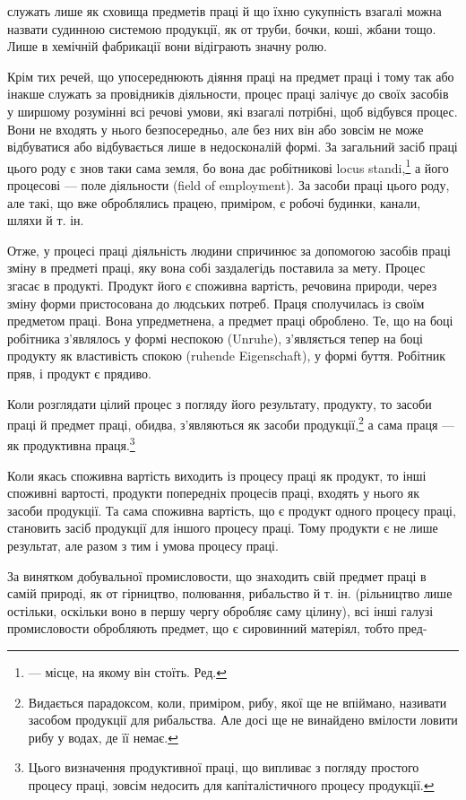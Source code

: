 служать лише як сховища предметів праці й що їхню сукупність
взагалі можна назвати судинною системою продукції, як от
труби, бочки, коші, жбани тощо. Лише в хемічній фабрикації
вони відіграють значну ролю.

Крім тих речей, що упосереднюють діяння праці на предмет
праці і тому так або інакше служать за провідників діяльности,
процес праці залічує до своїх засобів у ширшому розумінні всі
речові умови, які взагалі потрібні, щоб відбувся процес. Вони
не входять у нього безпосередньо, але без них він або зовсім
не може відбуватися або відбувається лише в недосконалій формі.
За загальний засіб праці цього роду є знов таки сама земля, бо
вона дає робітникові locus standi,\footnote*{
— місце, на якому він стоїть. Ред.
} а його процесові — поле
діяльности (field of employment). За засоби праці цього роду,
але такі, що вже оброблялись працею, приміром, є робочі будинки,
канали, шляхи й т. ін.

Отже, у процесі праці діяльність людини спричинює за допомогою
засобів праці зміну в предметі праці, яку вона собі заздалегідь
поставила за мету. Процес згасає в продукті. Продукт його є
споживна вартість, речовина природи, через зміну форми пристосована
до людських потреб. Праця сполучилась із своїм предметом
праці. Вона упредметнена, а предмет праці оброблено. Те, що
на боці робітника з’являлось у формі неспокою (Unruhe), з’являється
тепер на боці продукту як властивість спокою (ruhende
Eigenschaft), у формі буття. Робітник пряв, і продукт є прядиво.

Коли розглядати цілий процес з погляду його результату,
продукту, то засоби праці й предмет праці, обидва, з’являються
як засоби продукції,\footnote{
Видається парадоксом, коли, приміром, рибу, якої ще не впіймано,
називати засобом продукції для рибальства. Але досі ще не винайдено
вмілости ловити рибу у водах, де її немає.
} а сама праця — як продуктивна праця.\footnote{
Цього визначення продуктивної праці, що випливає з погляду простого
процесу праці, зовсім недосить для капіталістичного процесу продукції.
}

Коли якась споживна вартість виходить із процесу праці як
продукт, то інші споживні вартості, продукти попередніх процесів
праці, входять у нього як засоби продукції. Та сама споживна
вартість, що є продукт одного процесу праці, становить засіб
продукції для іншого процесу праці. Тому продукти є не лише
результат, але разом з тим і умова процесу праці.

За винятком добувальної промисловости, що знаходить свій
предмет праці в самій природі, як от гірництво, полювання,
рибальство й т. ін. (рільництво лише остільки, оскільки воно в
першу чергу обробляє саму цілину), всі інші галузі промисловости
обробляють предмет, що є сировинний матеріял, тобто пред-